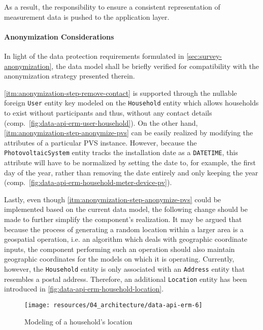 As a result, the responsibility to ensure a consistent representation of measurement data is pushed to the application layer.


\paragraph{Anonymization Considerations}
In light of the data protection requirements formulated in \autoref{sec:survey-anonymization}, the data model shall be briefly verified for compatibility with the anonymization strategy presented therein.

\ref{itm:anonymization-step-remove-contact} is supported through the nullable foreign \texttt{User} entity key modeled on the \texttt{Household} entity which allows households to exist without participants and thus, without any contact details (comp.~\autoref{fig:data-api-erm-user-household}). On the other hand, \ref{itm:anonymization-step-anonymize-pvs} can be easily realized by modifying the attributes of a particular \acs{PVS} instance. However, because the \texttt{PhotovoltaicSystem} entity tracks the installation date as a \texttt{DATETIME}, this attribute will have to be normalized by setting the date to, for example, the first day of the year, rather than removing the date entirely and only keeping the year (comp.~\autoref{fig:data-api-erm-household-meter-device-pv}).

Lastly, even though \ref{itm:anonymization-step-anonymize-pvs} could be implemented based on the current data model, the following change should be made to further simplify the component's realization. It may be argued that because the process of generating a random location within a larger area is a geospatial operation, i.e. an algorithm which deals with geographic coordinate inputs, the component performing such an operation should also maintain geographic coordinates for the models on which it is operating. Currently, however, the \texttt{Household} entity is only associated with an \texttt{Address} entity that resembles a postal address. Therefore, an additional \texttt{Location} entity has been introduced in \autoref{fig:data-api-erm-household-location}.

\begin{figure}[hbt]
  \centering
  \texttt{[image: resources/04\_architecture/data-api-erm-6]}
  \caption{Modeling of a household's location}
  \label{fig:data-api-erm-household-location}
\end{figure}

